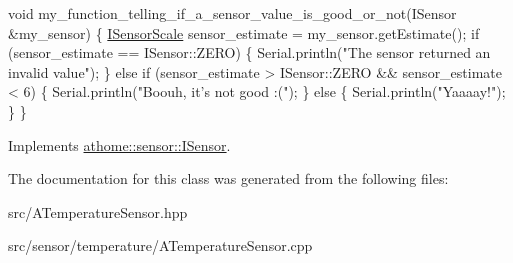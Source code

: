 \begin{DoxyCode}
\textcolor{keywordtype}{void} my\_function\_telling\_if\_a\_sensor\_value\_is\_good\_or\_not(ISensor
&my\_sensor) \{ \mbox{\hyperlink{classathome_1_1sensor_1_1_i_sensor_aa70bc27a4c17c86caf96cca776541ddf}{ISensorScale}} sensor\_estimate = my\_sensor.getEstimate(); \textcolor{keywordflow}{if}
(sensor\_estimate == ISensor::ZERO) \{ Serial.println(\textcolor{stringliteral}{"The sensor returned an}
\textcolor{stringliteral}{invalid value"});
  \}
  \textcolor{keywordflow}{else} \textcolor{keywordflow}{if} (sensor\_estimate > ISensor::ZERO && sensor\_estimate < 6) \{
    Serial.println(\textcolor{stringliteral}{"Boouh, it's not good :("});
  \}
  \textcolor{keywordflow}{else} \{
    Serial.println(\textcolor{stringliteral}{"Yaaaay!"});
  \}
\}
\end{DoxyCode}
 

Implements \mbox{\hyperlink{classathome_1_1sensor_1_1_i_sensor_af86df8538fecfcfc670b4adfbbde6abb}{athome\+::sensor\+::\+I\+Sensor}}.



The documentation for this class was generated from the following files\+:\begin{DoxyCompactItemize}
\item 
src/A\+Temperature\+Sensor.\+hpp\item 
src/sensor/temperature/A\+Temperature\+Sensor.\+cpp\end{DoxyCompactItemize}
